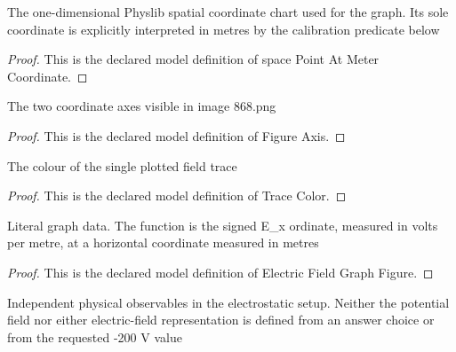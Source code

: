 \begin{definition}
  \label{def:physics:phyx-mini-0868:phyxminiproblems-problemphyxmini0868-spacepointatmetercoordinate}
  The one-dimensional Physlib spatial coordinate chart used for the graph. Its sole coordinate is explicitly interpreted in metres by the calibration predicate below
\end{definition}
\begin{proof}
  This is the declared model definition of space Point At Meter Coordinate.
\end{proof}
\begin{definition}
  \label{def:physics:phyx-mini-0868:phyxminiproblems-problemphyxmini0868-figureaxis}
  The two coordinate axes visible in image 868.png
\end{definition}
\begin{proof}
  This is the declared model definition of Figure Axis.
\end{proof}
\begin{definition}
  \label{def:physics:phyx-mini-0868:phyxminiproblems-problemphyxmini0868-tracecolor}
  The colour of the single plotted field trace
\end{definition}
\begin{proof}
  This is the declared model definition of Trace Color.
\end{proof}
\begin{definition}
  \label{def:physics:phyx-mini-0868:phyxminiproblems-problemphyxmini0868-electricfieldgraphfigure}
  Literal graph data. The function is the signed E\_x ordinate, measured in volts per metre, at a horizontal coordinate measured in metres
\end{definition}
\begin{proof}
  This is the declared model definition of Electric Field Graph Figure.
\end{proof}
\begin{definition}
  \label{def:physics:phyx-mini-0868:phyxminiproblems-problemphyxmini0868-electricfieldpotentialsetup}
  Independent physical observables in the electrostatic setup. Neither the potential field nor either electric-field representation is defined from an answer choice or from the requested -200 V value
\end{definition}
